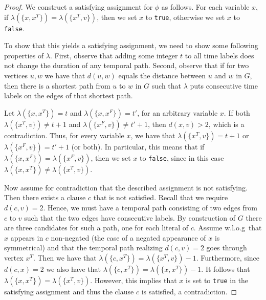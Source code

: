 \documentclass[11pt,a4paper]{article}
\theoremstyle{remark}
\theoremstyle{definition}
\begin{document}
\begin{proof}
We construct a satisfying assignment for $\phi$ as follows. For each variable $x$, if $\lambda(\{x,x^T\})=\lambda(\{x^T,v\})$, then we set $x$ to \texttt{true}, otherwise we set $x$ to \texttt{false}.

To show that this yields a satisfying assignment, we need to show some following properties of $\lambda$.
First, observe that adding some integer $t$ to all time labels does not change the duration of any temporal path. Second, observe that if for two vertices $u,w$ we have that $d(u,w)$ equals the distance between $u$ and $w$ in $G$, then there is a shortest path from $u$ to $w$ in $G$ such that $\lambda$ puts consecutive time labels on the edges of that shortest path. 


Let $\lambda(\{x,x^T\})=t$ and $\lambda(\{x,x^F\})=t'$, for an arbitrary variable $x$. 
If both $\lambda(\{x^T,v\})\neq t+1$ and $\lambda(\{x^F,v\})\neq t'+1$, then $d(x,v)>2$, which is a contradiction. 
Thus, for every variable $x$, we have that $\lambda(\{x^T,v\})= t+1$ or $\lambda(\{x^F,v\})= t'+1$ (or both). 
In particular, this means that if $\lambda(\{x,x^F\})=\lambda(\{x^F,v\})$, then we set $x$ to \texttt{false}, since in this case $\lambda(\{x,x^T\})\neq\lambda(\{x^T,v\})$.


Now assume for contradiction that the described assignment is not satisfying. Then there exists a clause $c$ that is not satisfied. Recall that we require $d(c,v)=2$. Hence, we must have a temporal path consisting of two edges from $c$ to $v$ such that the two edges have consecutive labels. By construction of $G$ there are three candidates for such a path, one for each literal of $c$. 
Assume w.l.o.g\ that $x$ appears in $c$ non-negated (the case of a negated appearance of $x$ is symmetrical) and that the temporal path realizing $d(c,v)=2$ goes through vertex $x^T$. 
Then we have that $\lambda(\{c,x^T\})=\lambda(\{x^T,v\})-1$. Furthermore, since $d(c,x)=2$ we also have that $\lambda(\{c,x^T\})=\lambda(\{x,x^T\})-1$. It follows that $\lambda(\{x,x^T\})=\lambda(\{x^T,v\})$. However, this implies that $x$ is set to \texttt{true} in the satisfying assignment and thus the clause $c$ is satisfied, a contradiction. 




\end{proof}
\end{document}

